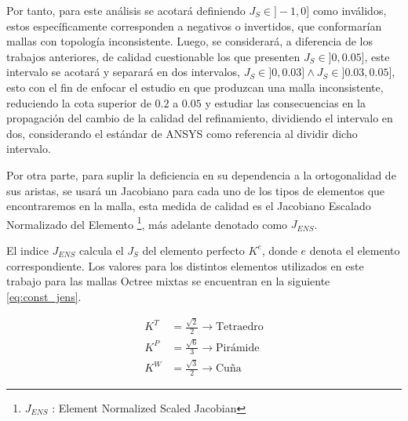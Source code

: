%
Por tanto, para este análisis se acotará definiendo $J_{S} \in ]-1, 0]$ como \elements{} inválidos, estos específicamente corresponden a \elements{} negativos o invertidos, que conformarían mallas con topología inconsistente. Luego, se considerará, a diferencia de los trabajos anteriores, \elements{} de calidad cuestionable los que presenten $J_{S} \in ]0, 0.05]$, este intervalo se acotará y separará en dos intervalos, $J_{S} \in ]0, 0.03] \wedge J_{S} \in ]0.03 , 0.05]$, esto con el fin de enfocar el estudio en \elements{} que produzcan una malla inconsistente, reduciendo la cota superior de $0.2$ a $0.05$ y estudiar las consecuencias en la propagación del cambio de la calidad del refinamiento, dividiendo el intervalo en dos, considerando el estándar de ANSYS como referencia al dividir dicho intervalo.

%


Por otra parte, para suplir la deficiencia en su dependencia a la ortogonalidad de sus aristas, se usará un Jacobiano para cada uno de los tipos de elementos que encontraremos en la malla, esta medida de calidad es el Jacobiano Escalado Normalizado del Elemento \footnote{$J_{ENS}$ : Element Normalized Scaled Jacobian}, más adelante denotado como $J_{ENS}$.


El indice $J_{ENS}$ calcula el $J_S$ del elemento perfecto $K^e$, donde $e$ denota el elemento correspondiente. Los valores para los distintos elementos utilizados en este trabajo para las mallas Octree mixtas se encuentran en la siguiente \autoref{eq:const_jens}.


\begin{equation} \label{eq:const_jens}
    \begin{aligned}
    K^T &= \frac{\sqrt{2}}{2} \longrightarrow \text{Tetraedro} \\
    K^P &= \frac{\sqrt{6}}{3} \longrightarrow \text{Pirámide} \\
    K^W &= \frac{\sqrt{3}}{2} \longrightarrow \text{Cuña}
    \end{aligned}
\end{equation}

